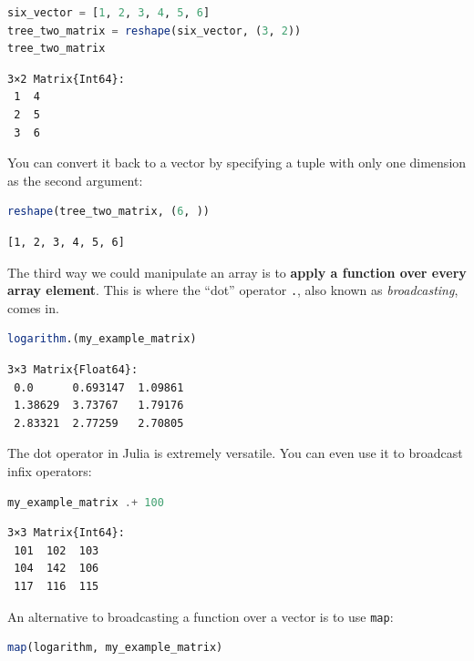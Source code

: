\documentclass[
  notoc %
]{tufte-book}
\newcommand{\passthrough}[1]{#1}
\begin{document}
\begin{lstlisting}[language=Julia]
six_vector = [1, 2, 3, 4, 5, 6]
tree_two_matrix = reshape(six_vector, (3, 2))
tree_two_matrix
\end{lstlisting}

\begin{lstlisting}[language=Output]
3×2 Matrix{Int64}:
 1  4
 2  5
 3  6
\end{lstlisting}

You can convert it back to a vector by specifying a tuple with only one
dimension as the second argument:

\begin{lstlisting}[language=Julia]
reshape(tree_two_matrix, (6, ))
\end{lstlisting}

\begin{lstlisting}[language=Output]
[1, 2, 3, 4, 5, 6]
\end{lstlisting}

The third way we could manipulate an array is to \textbf{apply a
function over every array element}. This is where the ``dot'' operator
\passthrough{\lstinline!.!}, also known as \emph{broadcasting}, comes
in.

\begin{lstlisting}[language=Julia]
logarithm.(my_example_matrix)
\end{lstlisting}

\begin{lstlisting}[language=Output]
3×3 Matrix{Float64}:
 0.0      0.693147  1.09861
 1.38629  3.73767   1.79176
 2.83321  2.77259   2.70805
\end{lstlisting}

The dot operator in Julia is extremely versatile. You can even use it to
broadcast infix operators:

\begin{lstlisting}[language=Julia]
my_example_matrix .+ 100
\end{lstlisting}

\begin{lstlisting}[language=Output]
3×3 Matrix{Int64}:
 101  102  103
 104  142  106
 117  116  115
\end{lstlisting}

An alternative to broadcasting a function over a vector is to use
\passthrough{\lstinline!map!}:

\begin{lstlisting}[language=Julia]
map(logarithm, my_example_matrix)
\end{lstlisting}
\end{document}
